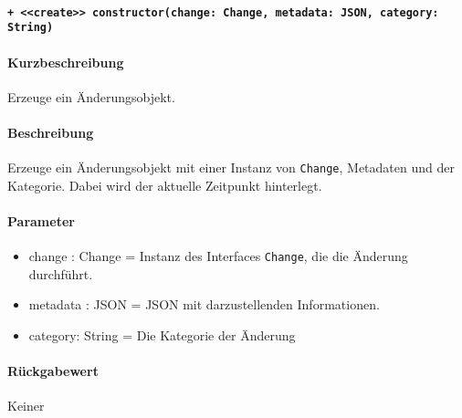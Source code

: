 \paragraph{\texttt{+ <<create>> constructor(change: Change, metadata: JSON, category: String)}}%
\paragraph*{Kurzbeschreibung}
Erzeuge ein Änderungsobjekt.
\paragraph*{Beschreibung}
Erzeuge ein Änderungsobjekt mit einer Instanz von \verb#Change#, Metadaten und der Kategorie.
Dabei wird der aktuelle Zeitpunkt hinterlegt.
\paragraph*{Parameter}
\begin{itemize}
    \item change : Change = Instanz des Interfaces \verb#Change#, die die Änderung durchführt.
    \item metadata : JSON = JSON mit darzustellenden Informationen.
    \item category: String = Die Kategorie der Änderung
\end{itemize}
\paragraph*{Rückgabewert}
Keiner